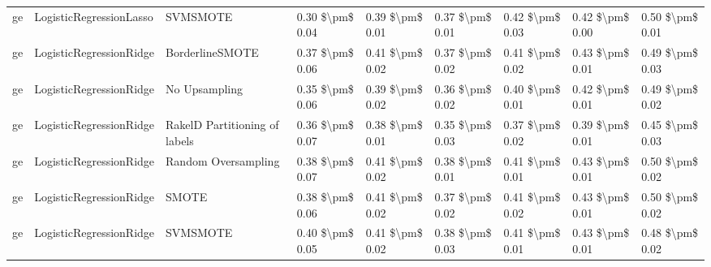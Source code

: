\begin{tabular}{lllllllll}
      ge &         LogisticRegressionLasso &                      SVMSMOTE & 0.30 \$\textbackslash pm\$ 0.04 &           0.39 \$\textbackslash pm\$ 0.01 &       0.37 \$\textbackslash pm\$ 0.01 &        0.42 \$\textbackslash pm\$ 0.03 &                         0.42 \$\textbackslash pm\$ 0.00 &     0.50 \$\textbackslash pm\$ 0.01 \\
      ge &         LogisticRegressionRidge &               BorderlineSMOTE & 0.37 \$\textbackslash pm\$ 0.06 &           0.41 \$\textbackslash pm\$ 0.02 &       0.37 \$\textbackslash pm\$ 0.02 &        0.41 \$\textbackslash pm\$ 0.02 &                         0.43 \$\textbackslash pm\$ 0.01 &     0.49 \$\textbackslash pm\$ 0.03 \\
      ge &         LogisticRegressionRidge &                 No Upsampling & 0.35 \$\textbackslash pm\$ 0.06 &           0.39 \$\textbackslash pm\$ 0.02 &       0.36 \$\textbackslash pm\$ 0.02 &        0.40 \$\textbackslash pm\$ 0.01 &                         0.42 \$\textbackslash pm\$ 0.01 &     0.49 \$\textbackslash pm\$ 0.02 \\
      ge &         LogisticRegressionRidge & RakelD Partitioning of labels & 0.36 \$\textbackslash pm\$ 0.07 &           0.38 \$\textbackslash pm\$ 0.01 &       0.35 \$\textbackslash pm\$ 0.03 &        0.37 \$\textbackslash pm\$ 0.02 &                         0.39 \$\textbackslash pm\$ 0.01 &     0.45 \$\textbackslash pm\$ 0.03 \\
      ge &         LogisticRegressionRidge &           Random Oversampling & 0.38 \$\textbackslash pm\$ 0.07 &           0.41 \$\textbackslash pm\$ 0.02 &       0.38 \$\textbackslash pm\$ 0.01 &        0.41 \$\textbackslash pm\$ 0.01 &                         0.43 \$\textbackslash pm\$ 0.01 &     0.50 \$\textbackslash pm\$ 0.02 \\
      ge &         LogisticRegressionRidge &                         SMOTE & 0.38 \$\textbackslash pm\$ 0.06 &           0.41 \$\textbackslash pm\$ 0.02 &       0.37 \$\textbackslash pm\$ 0.02 &        0.41 \$\textbackslash pm\$ 0.02 &                         0.43 \$\textbackslash pm\$ 0.01 &     0.50 \$\textbackslash pm\$ 0.02 \\
      ge &         LogisticRegressionRidge &                      SVMSMOTE & 0.40 \$\textbackslash pm\$ 0.05 &           0.41 \$\textbackslash pm\$ 0.02 &       0.38 \$\textbackslash pm\$ 0.03 &        0.41 \$\textbackslash pm\$ 0.01 &                         0.43 \$\textbackslash pm\$ 0.01 &     0.48 \$\textbackslash pm\$ 0.02 \\

\end{tabular}
